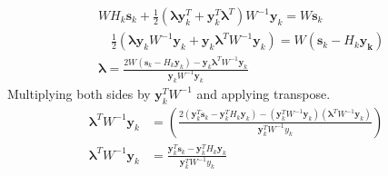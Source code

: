 \documentclass[12pt]{report}
\begin{document}
$$
	\begin{aligned}
		 & W H_{k} \bm{s}_{k}+\frac{1}{2}\left(\bm{\lambda} \bm{y}_k^{T}+\bm{y}_{k}^{T} \bm{\lambda}^{T}\right) W^{-1} \bm{y}_{k}=W \bm{s}_{k}                           \\
		 & \quad \frac{1}{2}\left(\bm{\lambda} \bm{y}_k W^{-1} \bm{y}_{k}+\bm{y}_{k} \bm{\lambda}^{T} W^{-1} \bm{y}_{k}\right)=W\left(\bm{s}_{k}-H_{k} \bm{y_{k}}\right) \\
		 & \bm{\lambda}=\frac{2 W\left(\bm{s}_{k}-H_{k} \bm{y}_k\right)-\bm{y}_{k} \bm{\lambda}^{T} W^{-1} \bm{y}_{k}}{\bm{y}_{k} W^{-1} {\bm y_{k}}}
	\end{aligned}
$$
Multiplying both sides by $\bm{y}_k^{T} W^{-1}$ and applying transpose.
$$
	\begin{aligned}
		\bm{\lambda}^{T} W^{-1} \bm{y}_k & =
		\left(\frac{2(\bm{y}_{k}^{T} \bm{s}_k
		-\bm y_{k}^{T}H_k \bm y_{k})
		- \left(\bm{y}_{k}^{T} W^{-1} \bm{y}_{k}\right)
		\left(\bm{\lambda}^{T} W^{-1} \bm{y}_{k}\right)}{\bm{y}_k^{T} W^{-1} y_{k}                                                                                                          }\right) \\
		\bm{\lambda}^{T} W^{-1} \bm{y}_k & =
		\frac{\bm{y}_{k}^{T} \bm{s}_k
		-\bm y_{k}^{T}H_k \bm y_{k}
		}{\bm{y}_k^{T} W^{-1} y_{k}}
	\end{aligned}
$$
\end{document}
